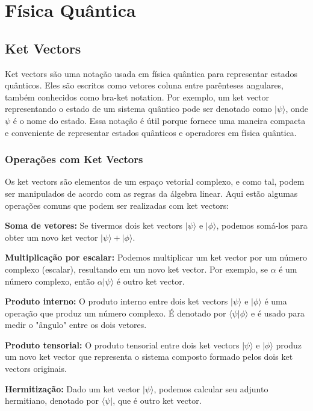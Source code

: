 \documentclass[12pt]{article}
\begin{document}
\newpage
\section{Física Quântica}

\subsection{Ket Vectors}


Ket vectors são uma notação usada em física quântica para representar estados quânticos. Eles são escritos como vetores coluna entre parênteses angulares, também conhecidos como bra-ket notation. Por exemplo, um ket vector representando o estado de um sistema quântico pode ser denotado como $|\psi\rangle$, onde $\psi$ é o nome do estado. Essa notação é útil porque fornece uma maneira compacta e conveniente de representar estados quânticos e operadores em física quântica.

\subsubsection{Operações com Ket Vectors}


Os ket vectors são elementos de um espaço vetorial complexo, e como tal, podem ser manipulados de acordo com as regras da álgebra linear. Aqui estão algumas operações comuns que podem ser realizadas com ket vectors:

\textbf{Soma de vetores:} Se tivermos dois ket vectors $|\psi\rangle$ e $|\phi\rangle$, podemos somá-los para obter um novo ket vector $|\psi\rangle + |\phi\rangle$.

\textbf{Multiplicação por escalar:} Podemos multiplicar um ket vector por um número complexo (escalar), resultando em um novo ket vector. Por exemplo, se $\alpha$ é um número complexo, então $\alpha|\psi\rangle$ é outro ket vector.

\textbf{Produto interno:} O produto interno entre dois ket vectors $|\psi\rangle$ e $|\phi\rangle$ é uma operação que produz um número complexo. É denotado por $\langle\psi|\phi\rangle$ e é usado para medir o "ângulo" entre os dois vetores.

\textbf{Produto tensorial:} O produto tensorial entre dois ket vectors $|\psi\rangle$ e $|\phi\rangle$ produz um novo ket vector que representa o sistema composto formado pelos dois ket vectors originais.

\textbf{Hermitização:} Dado um ket vector $|\psi\rangle$, podemos calcular seu adjunto hermitiano, denotado por $\langle\psi|$, que é outro ket vector.
\end{document}
